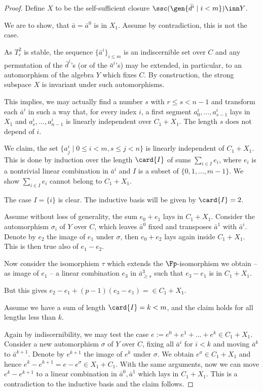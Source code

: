 \begin{proof}
Define $X$ to be the self-sufficient closure $\ssc(\gen{\bar d^{i}\mid i<m})\inn Y$.

\smallskip
We are to show, that $\bar a=\bar a^{0}$ is in $X_{1}$. Assume by contradiction, this is not the case.

\smallskip
As $T^{2}_{c}$ is stable, the sequence $\{\bar a^{i}\}_{i\leq m}$ is an indiscernible set over $C$ and any permutation of the $\bar d^{i}$'s
(or of the $\bar a^{i}$'s) may be extended, in particular,
to an automorphism of the algebra $Y$ which fixes $C$.
By construction, the strong subspace $X$ is invariant under such automorphisms.

This implies, we may actually find a number $s$ with $r\leq s<n-1$ and transform each $\bar a^{i}$ in such a way that, for every index $i$,
a first segment $a^{i}_{0},\dots, a^{i}_{s-1}$ lays in $X_{1}$ and $a^{i}_{s},\dots,a^{i}_{n-1}$ is linearly independent over $C_{1}+X_{1}$.
The length $s$ does not depend of $i$.

\smallskip
We claim, the set $\{a^{i}_{j}\mid0\leq i<m,s\leq j<n\}$ is linearly independent of $C_{1}+X_{1}$.
This is done by induction over the length $\card{I}$ of sums $\sum_{i\in I}e_{i}$, where $e_{i}$ is a nontrivial linear combination
in $\bar a^{i}$ and $I$ is a subset of $\{0,1,\dots,m-1\}$. We show $\sum_{i\in I}e_{i}$ cannot belong to $C_{1}+X_{1}$.

The case $I=\{i\}$ is clear. The inductive basis will be given by $\card{I}=2$.

Assume without loss of generality, the sum $e_{0}+e_{1}$ lays in $C_{1}+X_{1}$. Consider the automorphism $\sigma_{i}$
of $Y$ over $C$, which leaves $\bar a^{0}$ fixed and transposes $\bar a^{1}$ with $\bar a^{i}$. Denote by $e_{2}$
the image of $e_{1}$ under $\sigma$, then $e_{0}+e_{2}$ lays again inside $C_{1}+X_{1}$.
This is then true also of $e_{1}-e_{2}$.



Now consider the isomorphism $\tau$ which extends the $\Fp$-isomorphism we obtain -- as image of $e_{1}$ -- %
a linear combination $e_{3}$ in $\bar a^{3}_{\geq s}$ such that
$e_{3}-e_{1}$ is in $C_{1}+X_{1}$.

But this gives $e_{2}-e_{1}+(p-1)(e_{3}-e_{1})=\in C_{1}+X_{1}$.

Assume we have a sum of length $\card{I}=k<m$, and the claim holds for all lengths less than $k$.

Again by indiscernibility, we may test the case $e:=e^{0}+e^{1}+\dots+e^{k}\in C_{1}+X_{1}$. Consider a new automorphism $\sigma$
of $Y$ over $C$, fixing all $\bar a^{i}$ for $i<k$ and moving $\bar a^{k}$ to $\bar a^{k+1}$. Denote by $e^{k+1}$ the image of
$e^{k}$ under $\sigma$. We obtain $e^{\sigma}\in C_{1}+X_{1}$ and hence $e^{k}-e^{k+1}=e-e^{\sigma}\in X_{1}+C_{1}$.
With the same arguments, now we can move $e^{k}-e^{k+1}$ to a linear combination in $\bar a^{0},\bar a^{1}$ which
lays in $C_{1}+X_{1}$. This is a contradiction to the inductive basis and the claim follows.


\end{proof}
